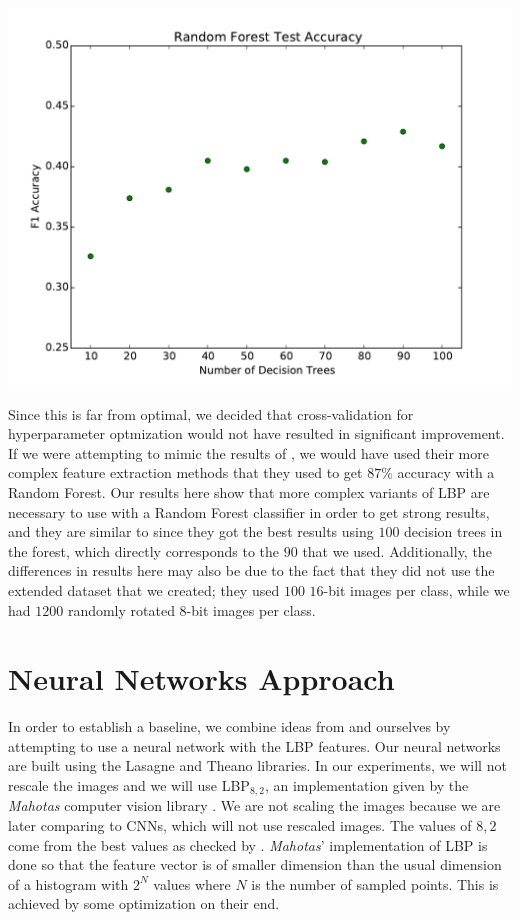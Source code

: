 \begin{multicols}{2}
\begin{Figure}
	\centering
	\includegraphics[width=1.0\linewidth]{images/random_forest_results.pdf}
	\label{fig:random_forest}
\end{Figure}

Since this is far from optimal, we decided that cross-validation for hyperparameter optmization would not have resulted in significant improvement.  If we were attempting to mimic the results of \citet{kylberg2011virus}, we would have used their more complex feature extraction methods that they used to get $87\%$ accuracy with a Random Forest. Our results here show that more complex variants of LBP are necessary to use with a Random Forest classifier in order to get strong results, and they are similar to \citet{kylberg2011virus} since they got the best results using $100$ decision trees in the forest, which directly corresponds to the $90$ that we used. Additionally, the differences in results here may also be due to the fact that they did not use the extended dataset that we created; they used $100$ $16$-bit images per class, while we had $1200$ randomly rotated $8$-bit images per class.

\section{Neural Networks Approach}
In order to establish a baseline, we combine ideas from \citet{kylberg2011virus} and ourselves by attempting to use a neural network with the LBP features. Our neural networks are built using the Lasagne and Theano \cite{Bastien-Theano-2012, bergstra+al:2010-scipy} libraries. In our experiments, we will not rescale the images and we will use LBP$_{8,2}$, an implementation given by the \emph{Mahotas} computer vision library \citet{coelho2012mahotas}. We are not scaling the images because we are later comparing to CNNs, which will not use rescaled images. The values of $8,2$ come from the best values as checked by \citet{kylberg2011virus}. \emph{Mahotas}' implementation of LBP is done so that the feature vector is of smaller dimension than the usual dimension of a histogram with $2^N$ values where $N$ is the number of sampled points. This is achieved by some optimization on their end. 

\end{multicols}

